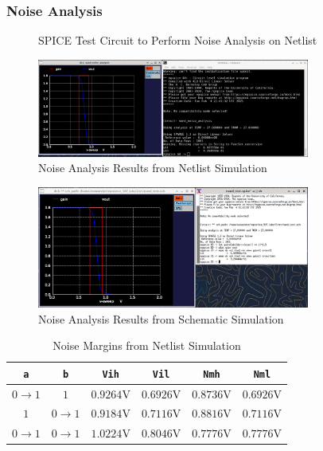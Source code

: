 \documentclass{article}
\begin{document}
	\subsubsection{Noise Analysis}
	\begin{figure}[H]
		
		\caption{SPICE Test Circuit to Perform Noise Analysis on Netlist}
		\label{fig::nand_noise_analysis_test_circuit}
	\end{figure}
	
	\begin{figure}[H]
		\centerline{\includegraphics[width=0.8\textwidth]{nand_noise_analysis.png}}
		\caption{Noise Analysis Results from Netlist Simulation}
		\label{fig::nand_noise_analysis}
	\end{figure}
	
	\begin{figure}[H]
		\centerline{\includegraphics[width=0.8\textwidth]{nand_noise_analysis_schem.png}}
		\caption{Noise Analysis Results from Schematic Simulation}
		\label{fig::nand_noise_analysis_schem}
	\end{figure}
	
	\begin{table}[H]
	\begin{center}
	\caption{Noise Margins from Netlist Simulation}
	\label{table::nand_gate_noise_analysis}
	\begin{tabular}{| c | c | c | c | c | c |}
		\hline
		\texttt{a} & \texttt{b} & \texttt{Vih} & \texttt{Vil} & \texttt{Nmh} & \texttt{Nml} \\
		\hline	
		$0 \rightarrow 1$ & $1$ & $0.9264 \text{V}$ & $0.6926 \text{V}$ & $0.8736 \text{V}$ & $0.6926 \text{V}$\\
		\hline	
		$1$ & $0 \rightarrow 1$ & $0.9184 \text{V}$ & $0.7116 \text{V}$ & $0.8816 \text{V}$ & $0.7116 \text{V}$\\
		\hline	
		$0 \rightarrow 1$ & $0 \rightarrow 1$ & $1.0224 \text{V}$ & $0.8046 \text{V}$ & $0.7776 \text{V}$ & $0.7776 \text{V}$\\
		\hline
	\end{tabular}
	\end{center}
	\end{table}
	
\end{document}
